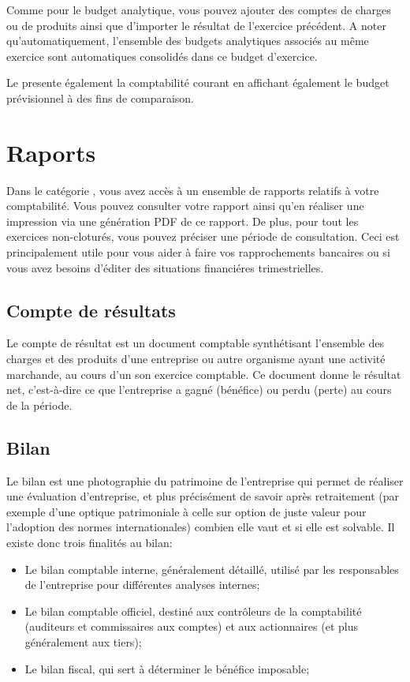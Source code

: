 \documentclass[a4paper,10pt,oneside,french]{sphinxmanual}
\begin{document}
Comme pour le budget analytique, vous pouvez ajouter des comptes de charges ou de produits ainsi que d’importer le résultat de l’exercice précédent.
A noter qu’automatiquement, l’ensemble des budgets analytiques associés au même exercice sont automatiques consolidés dans ce budget d’exercice.

Le  presente également la comptabilité courant en affichant également le budget prévisionnel à des fins de comparaison.


\section{Raports}
\label{\detokenize{accounting/reporting:raports}}\label{\detokenize{accounting/reporting::doc}}
Dans le catégorie , vous avez accès à un ensemble de rapports relatifs à votre comptabilité.
Vous pouvez consulter votre rapport ainsi qu’en réaliser une impression via une génération PDF de ce rapport.
De plus, pour tout les exercices non-cloturés, vous pouvez préciser une période de consultation.
Ceci est principalement utile pour vous aider à faire vos rapprochements bancaires ou si vous avez besoins d’éditer des situations financiéres trimestrielles.


\subsection{Compte de résultats}
\label{\detokenize{accounting/reporting:compte-de-resultats}}
Le compte de résultat est un document comptable synthétisant l’ensemble des charges et des produits d’une entreprise ou autre organisme ayant une activité marchande, au cours d’un son exercice comptable.
Ce document donne le résultat net, c’est-à-dire ce que l’entreprise a gagné (bénéfice) ou perdu (perte) au cours de la période.


\subsection{Bilan}
\label{\detokenize{accounting/reporting:bilan}}
Le bilan est une photographie du patrimoine de l’entreprise qui permet de réaliser une évaluation d’entreprise, et plus précisément de savoir après retraitement (par exemple d’une optique patrimoniale à celle sur option de juste valeur pour l’adoption des normes internationales) combien elle vaut et si elle est solvable.
Il existe donc trois finalités au bilan:
\begin{itemize}
\item {} 
Le bilan comptable interne, généralement détaillé, utilisé par les responsables de l’entreprise pour différentes analyses internes;

\item {} 
Le bilan comptable officiel, destiné aux contrôleurs de la comptabilité (auditeurs et commissaires aux comptes) et aux actionnaires (et plus généralement aux tiers);

\item {} 
Le bilan fiscal, qui sert à déterminer le bénéfice imposable;

\end{itemize}
\end{document}
